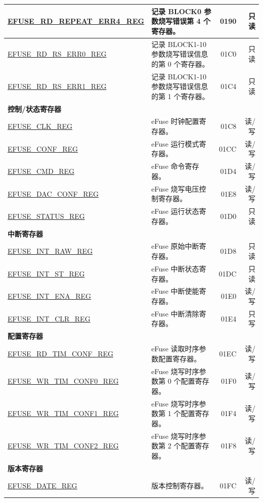\begin{longtable}{ | m{6cm} |m{7.2cm} | r| r | }
\hyperref[regdesc:EFUSERDREPEATERR4REG]{EFUSE\_RD\_REPEAT\_ERR4\_REG} &记录 BLOCK0 参数烧写错误第 4 个寄存器。 & \hexprefix{}0190 & 只读 \\ \hline
\hyperref[regdesc:EFUSERDRSERR0REG]{EFUSE\_RD\_RS\_ERR0\_REG} & 记录 BLOCK1-10 参数烧写错误信息的第 0 个寄存器。 & \hexprefix{}01C0 & 只读 \\ \hline
\hyperref[regdesc:EFUSERDRSERR1REG]{EFUSE\_RD\_RS\_ERR1\_REG} & 记录 BLOCK1-10 参数烧写错误信息的第 1 个寄存器。 & \hexprefix{}01C4 & 只读 \\ \hline
\multicolumn{4}{|l|}{\textbf{控制/状态寄存器}} \\ \hline
\hyperref[regdesc:EFUSECLKREG]{EFUSE\_CLK\_REG} & eFuse 时钟配置寄存器。 & \hexprefix{}01C8 & 读/写 \\ \hline
\hyperref[regdesc:EFUSECONFREG]{EFUSE\_CONF\_REG} & eFuse 运行模式寄存器。 & \hexprefix{}01CC & 读/写 \\ \hline
\hyperref[regdesc:EFUSECMDREG]{EFUSE\_CMD\_REG} & eFuse 命令寄存器。 & \hexprefix{}01D4 & 读/写 \\ \hline
\hyperref[regdesc:EFUSEDACCONFREG]{EFUSE\_DAC\_CONF\_REG} & eFuse 烧写电压控制寄存器。 & \hexprefix{}01E8 & 读/写 \\ \hline
\hyperref[regdesc:EFUSESTATUSREG]{EFUSE\_STATUS\_REG} & eFuse 运行状态寄存器。 & \hexprefix{}01D0 & 只读 \\ \hline
\multicolumn{4}{|l|}{\textbf{中断寄存器}} \\ \hline
\hyperref[regdesc:EFUSEINTRAWREG]{EFUSE\_INT\_RAW\_REG} & eFuse 原始中断寄存器。 & \hexprefix{}01D8 & 只读 \\ \hline
\hyperref[regdesc:EFUSEINTSTREG]{EFUSE\_INT\_ST\_REG} & eFuse 中断状态寄存器。 & \hexprefix{}01DC & 只读 \\ \hline
\hyperref[regdesc:EFUSEINTENAREG]{EFUSE\_INT\_ENA\_REG} & eFuse 中断使能寄存器。 & \hexprefix{}01E0 & 读/写 \\ \hline
\hyperref[regdesc:EFUSEINTCLRREG]{EFUSE\_INT\_CLR\_REG} & eFuse 中断清除寄存器。 & \hexprefix{}01E4 & 只写 \\ \hline
\multicolumn{4}{|l|}{\textbf{配置寄存器}} \\ \hline
\hyperref[regdesc:EFUSERDTIMCONFREG]{EFUSE\_RD\_TIM\_CONF\_REG} & eFuse 读取时序参数配置寄存器。 & \hexprefix{}01EC & 读/写 \\ \hline
\hyperref[regdesc:EFUSEWRTIMCONF0REG]{EFUSE\_WR\_TIM\_CONF0\_REG} & eFuse 烧写时序参数第 0 个配置寄存器。 & \hexprefix{}01F0 & 读/写 \\ \hline
\hyperref[regdesc:EFUSEWRTIMCONF1REG]{EFUSE\_WR\_TIM\_CONF1\_REG} & eFuse 烧写时序参数第 1 个配置寄存器。 & \hexprefix{}01F4 & 读/写 \\ \hline
\hyperref[regdesc:EFUSEWRTIMCONF2REG]{EFUSE\_WR\_TIM\_CONF2\_REG} & eFuse 烧写时序参数第 2 个配置寄存器。 & \hexprefix{}01F8 & 读/写 \\ \hline
\multicolumn{4}{|l|}{\textbf{版本寄存器}} \\ \hline
\hyperref[regdesc:EFUSEDATEREG]{EFUSE\_DATE\_REG} & 版本控制寄存器。 & \hexprefix{}01FC & 读/写 \\ \hline
\end{longtable}
